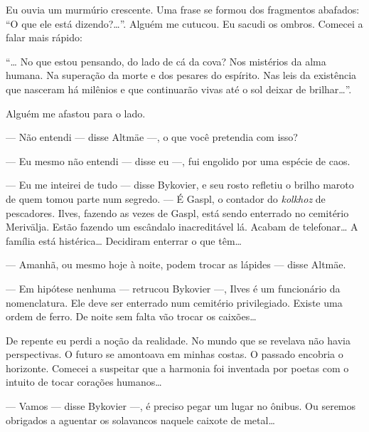 Eu ouvia um murmúrio crescente. Uma frase se formou dos fragmentos
abafados: ``O que ele está dizendo?\ldots{}''. Alguém me cutucou. Eu sacudi
os ombros. Comecei a falar mais rápido:

``\ldots{} No que estou pensando, do lado de cá da cova? Nos mistérios da \label{ref6}
alma humana. Na superação da morte e dos pesares do espírito. Nas leis
da existência que nasceram há milênios e que continuarão vivas até o sol
deixar de brilhar\ldots{}''.

Alguém me afastou para o lado.

--- Não entendi --- disse Altmäe ---, o que você pretendia com isso?

--- Eu mesmo não entendi --- disse eu ---, fui engolido por uma espécie
de caos.

--- Eu me inteirei de tudo --- disse Bykovier, e seu rosto refletiu o
brilho maroto de quem tomou parte num segredo. --- É Gaspl, o contador
do \emph{kolkhoz} de pescadores. Ilves, fazendo as vezes de Gaspl, está
sendo enterrado no cemitério Merivälja. Estão fazendo um escândalo
inacreditável lá. Acabam de telefonar\ldots{} A família está histérica\ldots{}
Decidiram enterrar o que têm\ldots{}

--- Amanhã, ou mesmo hoje à noite, podem trocar as lápides --- disse
Altmäe.

--- Em hipótese nenhuma --- retrucou Bykovier ---, Ilves é um
funcionário da nomenclatura. Ele deve ser enterrado num cemitério
privilegiado. Existe uma ordem de ferro. De noite sem falta vão trocar
os caixões\ldots{}

De repente eu perdi a noção da realidade. No mundo que se revelava não
havia perspectivas. O futuro se amontoava em minhas costas. O passado
encobria o horizonte. Comecei a suspeitar que a harmonia foi inventada
por poetas com o intuito de tocar corações humanos\ldots{}

--- Vamos --- disse Bykovier ---, é preciso pegar um lugar no ônibus. Ou
seremos obrigados a aguentar os solavancos naquele caixote de metal\ldots{}

\movetooddpage
\begin{center}
{}
\end{center}

